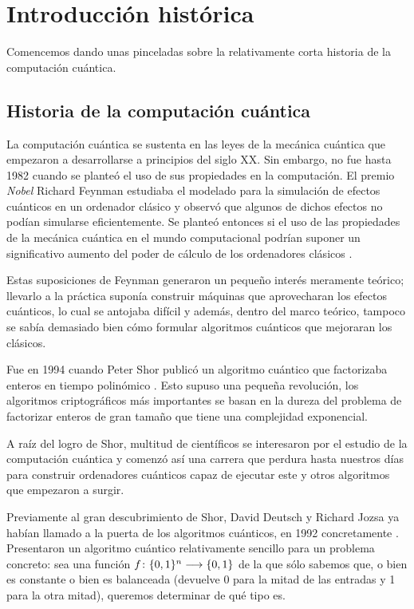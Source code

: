 \chapter{Introducción histórica}

Comencemos dando unas pinceladas sobre la relativamente corta historia de la computación cuántica.

\section{Historia de la computación cuántica}
La computación cuántica se sustenta en las leyes de la mecánica cuántica que empezaron a desarrollarse a principios del siglo XX. Sin embargo, no fue hasta 1982 cuando se planteó el uso de sus propiedades en la computación. El premio \textit{Nobel} Richard Feynman estudiaba el modelado para la simulación de efectos cuánticos en un ordenador clásico y observó que algunos de dichos efectos no podían simularse eficientemente. Se planteó entonces si el uso de las propiedades de la mecánica cuántica en el mundo computacional podrían suponer un significativo aumento del poder de cálculo de los ordenadores clásicos \cite{feynman1982modeling}.

Estas suposiciones de Feynman generaron un pequeño interés meramente teórico; llevarlo a la práctica suponía construir máquinas que aprovecharan los efectos cuánticos, lo cual se antojaba difícil y además, dentro del marco teórico, tampoco se sabía demasiado bien cómo formular algoritmos cuánticos que mejoraran los clásicos.

Fue en 1994 cuando Peter Shor publicó un algoritmo cuántico que factorizaba enteros en tiempo polinómico \autocite{shor1994algorithms}. Esto supuso una pequeña revolución, los algoritmos criptográficos más importantes se basan en la dureza del problema de factorizar enteros de gran tamaño que tiene una complejidad exponencial.

A raíz del logro de Shor, multitud de científicos se interesaron por el estudio de la computación cuántica y comenzó así una carrera que perdura hasta nuestros días para construir ordenadores cuánticos capaz de ejecutar este y otros algoritmos que empezaron a surgir.

Previamente al gran descubrimiento de Shor, David Deutsch y Richard Jozsa ya habían llamado a la puerta de los algoritmos cuánticos, en 1992 concretamente \cite{deutsch1992rapid}. Presentaron un algoritmo cuántico relativamente sencillo para un problema concreto: sea una función $f\colon \{0,1\}^n\longrightarrow \{0,1\}$ de la que sólo sabemos que, o bien es constante o bien es balanceada (devuelve 0 para la mitad de las entradas y 1 para la otra mitad), queremos determinar de qué tipo es.

